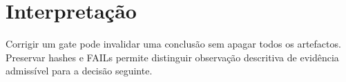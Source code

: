 \section{Interpretação}
Corrigir um gate pode invalidar uma conclusão sem apagar todos os artefactos. Preservar hashes e FAILs permite distinguir observação descritiva de evidência admissível para a decisão seguinte. 

